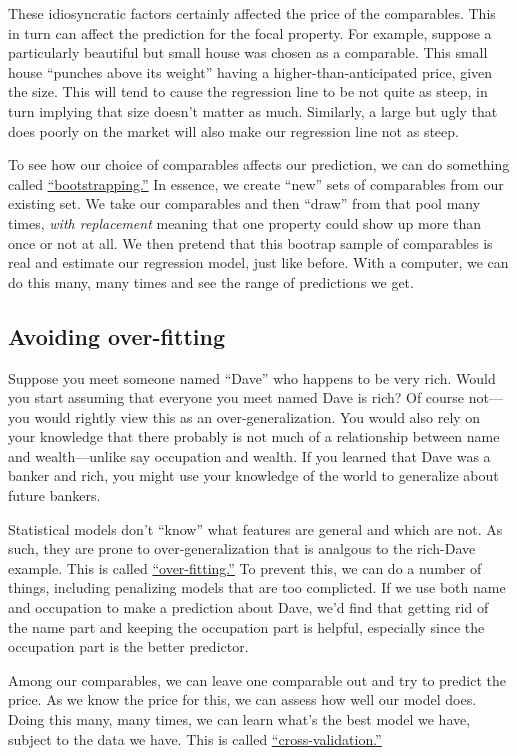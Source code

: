 \documentclass[
12pt, %
letterpaper, %
oneside, %
headinclude,footinclude, %
BCOR5mm, %
]{scrartcl}
\begin{document}
These idiosyncratic factors certainly affected the price of the comparables.
This in turn can affect the prediction for the focal property. 
For example, suppose a particularly beautiful but small house was chosen as a comparable.
This small house ``punches above its weight'' having a higher-than-anticipated price, given the size.
This will tend to cause the regression line to be not quite as steep, in turn implying that size doesn't matter as much.
Similarly, a large but ugly that does poorly on the market will also make our regression line not as steep.

To see how our choice of comparables affects our prediction, we can do something called \href{https://en.wikipedia.org/wiki/Bootstrapping_(statistics)}{``bootstrapping.''}
In essence, we create ``new'' sets of comparables from our existing set.
We take our comparables and then ``draw'' from that pool many times, \emph{with replacement} meaning that one property could show up more than once or not at all.
We then pretend that this bootrap sample of comparables is real and estimate our regression model, just like before.
With a computer, we can do this many, many times and see the range of predictions we get. 

\subsection{Avoiding over-fitting} \label{sec:regularization}
Suppose you meet someone named ``Dave'' who happens to be very rich.
Would you start assuming that everyone you meet named Dave is rich?
Of course not---you would rightly view this as an over-generalization.
You would also rely on your knowledge that there probably is not much of a relationship between name and wealth---unlike say occupation and wealth.
If you learned that Dave was a banker and rich, you might use your knowledge of the world to generalize about future bankers.

Statistical models don't ``know'' what features are general and which are not.
As such, they are prone to over-generalization that is analgous to the rich-Dave example. 
This is called \href{https://en.wikipedia.org/wiki/Overfitting}{``over-fitting.''}
To prevent this, we can do a number of things, including penalizing models that are too complicted.
If we use both name and occupation to make a prediction about Dave, we'd find that getting rid of the name part and keeping the occupation part is helpful, especially since the occupation part is the better predictor. 

Among our comparables, we can leave one comparable out and try to predict the price.
As we know the price for this, we can assess how well our model does.
Doing this many, many times, we can learn what's the best model we have, subject to the data we have.
This is called \href{https://en.wikipedia.org/wiki/Cross-validation_(statistics)}{``cross-validation.''}

\end{document}
